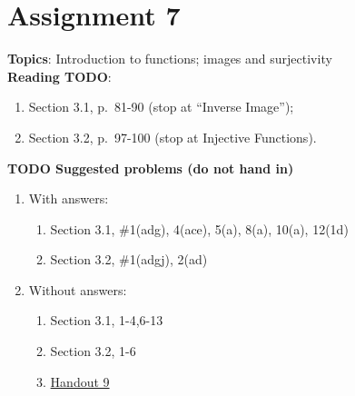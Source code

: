 \documentclass[12pt]{article}
\begin{document}
\newpage
\section[7 (due \csname dateWeek7\endcsname): Introduction to functions; images and surjectivity.]{Assignment 7}


\textbf{Topics}: Introduction to functions; images and surjectivity
\\

\noindent \textbf{Reading TODO}:
\begin{enumerate}
\item Section 3.1, p.~81-90 (stop at ``Inverse Image'');
\item Section 3.2, p.~97-100 (stop at Injective Functions).
\end{enumerate}

\noindent \textbf{TODO Suggested problems (do not hand in)}

\begin{enumerate}
\item With answers:
  \begin{enumerate}
\item Section 3.1, \#1(adg), 4(ace), 5(a), 8(a), 10(a), 12(1d)
\item Section 3.2, \#1(adgj), 2(ad)
\end{enumerate}  
\item Without answers:
  \begin{enumerate}
\item Section 3.1, 1-4,6-13
\item Section 3.2, 1-6
\item \href{https://www.math.emory.edu/~dzb/teaching/250Fall2021/handouts/250-H09-images.pdf}{Handout 9}
  \end{enumerate}    
\end{enumerate}
\end{document}
